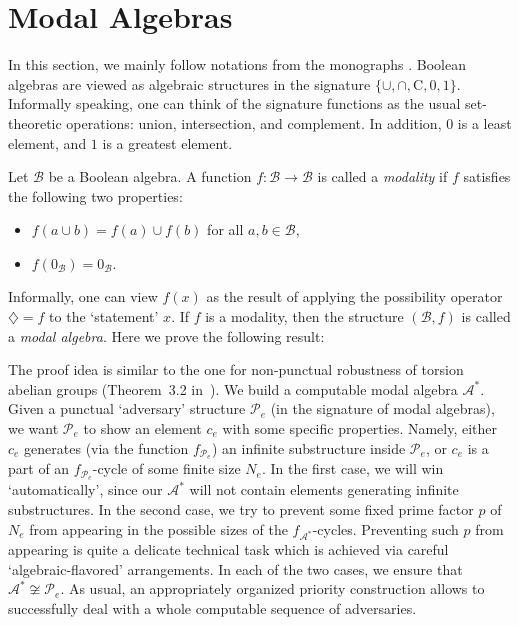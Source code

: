 \documentclass[a4paper,UKenglish,cleveref, autoref, thm-restate]{lipics-v2021}
\begin{document}
    
\section{Modal Algebras}\label{sect:modal-alg}

In this section, we mainly follow notations from the monographs \cite{Goncharov-Book, Koppelberg}. Boolean algebras are viewed as algebraic structures in the signature $\{ \cup, \cap, \mathrm{C}, 0, 1 \}$. Informally speaking, one can think of the signature functions as the usual set-theoretic operations: union, intersection, and complement. In addition, $0$ is a least element, and $1$ is a greatest element.

Let $\mathcal{B}$ be a Boolean algebra. A function $f\colon \mathcal{B} \to \mathcal{B}$ is called a \emph{modality} if $f$ satisfies the following two properties:
\begin{itemize}
	\item $f(a\cup b) = f(a) \cup f(b)$ for all $a,b\in\mathcal{B}$,
	
	\item $f(0_{\mathcal{B}}) = 0_{\mathcal{B}}$.
\end{itemize}
Informally, one can view $f(x)$ as the result of applying the possibility operator $\diamondsuit = f$ to the `statement' $x$.
If $f$ is a modality, then the structure $(\mathcal{B},f)$ is called a \emph{modal algebra}. 
Here we prove the following result:

\thmModalAlgebra*




The proof idea is similar to the one for non-punctual robustness of torsion abelian groups (Theorem~3.2 in~\cite{kalimullin_algebraic_2017}). 
We build a computable modal algebra $\mathcal{A}^{\ast}$. Given a punctual `adversary' structure $\mathcal{P}_e$ (in the signature of modal algebras), we want $\mathcal{P}_e$ to show an element $c_e$ with some specific properties. Namely, either $c_e$ generates (via the function $f_{\mathcal{P}_e}$) an infinite substructure inside $\mathcal{P}_e$, or $c_e$ is a part of an $f_{\mathcal{P}_e}$-cycle of some finite size $N_e$. In the first case, we will win `automatically', since our $\mathcal{A}^{\ast}$ will not contain elements generating infinite substructures. In the second case, we try to prevent some fixed prime factor $p$ of $N_e$ from appearing in the possible sizes of the $f_{\mathcal{A}^{\ast}}$-cycles. Preventing such $p$ from appearing is quite a delicate technical task which is achieved via careful `algebraic-flavored' arrangements. In each of the two cases, we ensure that $\mathcal{A}^{\ast} \not\cong \mathcal{P}_e$. As usual, an appropriately organized priority construction allows to successfully deal with a whole computable sequence of adversaries.
\end{document}
